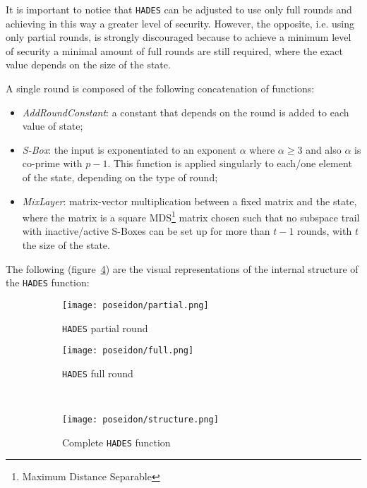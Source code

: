 \documentclass[12pt, a4paper]{report}
\begin{document}
\begin{note}
It is important to notice that \texttt{HADES} can be adjusted to use only full rounds and achieving in this way a greater level of security.
However, the opposite, i.e. using only partial rounds, is strongly discouraged because to achieve a minimum level of security a minimal amount of full rounds are still required, where the exact value depends on the size of the state.
\end{note}

A single round is composed of the following concatenation of functions:
\begin{itemize}
  \item \textit{AddRoundConstant}: a constant that depends on the round is added to each value of state;
  \item \textit{S-Box}: the input is exponentiated to an exponent $\alpha$ where $\alpha \ge 3$ and also $\alpha$ is co-prime with $p-1$. This function is applied singularly to each/one element of the state, depending on the type of round;
  \item \textit{MixLayer}: matrix-vector multiplication between a fixed matrix and the state, where the matrix is a square MDS\footnote{Maximum Distance Separable} matrix chosen such that no subspace trail with inactive/active S-Boxes can be set up for more than $t-1$ rounds, with $t$ the size of the state.
\end{itemize}

The following (figure~\ref{fig:poseidon}) are the visual representations of the internal structure of the \texttt{HADES} function:

\begin{figure}[H]
  \begin{center}
    \begin{subfigure}{0.35\textwidth}
      \texttt{[image: poseidon/partial.png]}
      \caption{\texttt{HADES} partial round}\label{subfig:poseidonpartial}
    \end{subfigure}
    \hfill
    \begin{subfigure}{0.35\textwidth}
      \texttt{[image: poseidon/full.png]}
      \caption{\texttt{HADES} full round}\label{subfig:poseidonfull}
    \end{subfigure}
    \\[10pt]
    \begin{subfigure}{0.35\textwidth}
      \texttt{[image: poseidon/structure.png]}
      \caption{Complete \texttt{HADES} function}\label{subfig:poseidonstructure}
    \end{subfigure}
  \end{center}
  \caption{}\label{fig:poseidon}
\end{figure}
\end{document}
